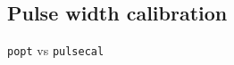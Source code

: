 \subsection{Pulse width calibration}
\label{subsec:poise__pulsecal}

\texttt{popt} vs \texttt{pulsecal}
